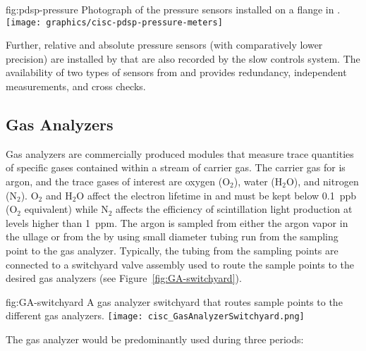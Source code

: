 \begin{dunefigure}{fig:pdsp-pressure}
  {Photograph of the pressure sensors installed on a flange in .}
  \texttt{[image: graphics/cisc-pdsp-pressure-meters]}
\end{dunefigure}

Further, relative and absolute pressure sensors (with comparatively lower precision) are installed by  that are also recorded by the slow controls system. The availability of two types of sensors from  and  provides redundancy, independent measurements, and cross checks.

\subsection{Gas Analyzers}
\label{sec:fdgen-slow-cryo-gas-anlyz}

 Gas analyzers are commercially produced modules that measure trace quantities of specific gases contained within a stream of carrier gas. The carrier gas for  is argon, and the trace gases of interest are oxygen ($\text{O}_2$), water ($\text{H}_2\text{O}$), and nitrogen ($\text{N}_2$). $\text{O}_2$ and $\text{H}_2\text{O}$ affect the electron lifetime in  and must be kept below \SI{0.1}{ppb} ($\text{O}_2$ equivalent) while $\text{N}_2$ affects the efficiency of scintillation light production at levels higher than \SI{1}{ppm}.
The argon is sampled from either the argon vapor in the ullage or from the  by using small diameter tubing run from the sampling point to the gas analyzer. Typically, the tubing from the sampling points are connected to a switchyard valve assembly used to route the sample points to the desired gas analyzers (see Figure~\ref{fig:GA-switchyard}).


\begin{dunefigure}{fig:GA-switchyard}
  {A gas analyzer switchyard that routes sample points to the different gas analyzers.}
  \texttt{[image: cisc\_GasAnalyzerSwitchyard.png]}
\end{dunefigure}

The gas analyzer would be predominantly used during three periods:

